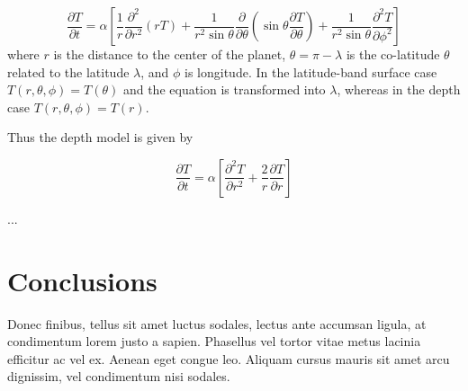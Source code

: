\documentclass[12pt, onecolumn]{revtex4-2}    %
\begin{document}
\begin{equation}
    \frac{\partial T}{\partial t}  = \alpha \left[\frac{1}{r} \frac{\partial^2 }{\partial r^2} (r T)
        + \frac{1}{r^2 \sin\theta} \frac{\partial}{\partial \theta}\left(\sin\theta \frac{\partial T}{\partial\theta}\right)
        + \frac{1}{r^2 \sin\theta} \frac{\partial^2 T}{\partial \phi^2} \right]
\end{equation}
where $r$ is the distance to the center of the planet, $\theta = \pi - \lambda$ is the co-latitude $\theta$ related to the latitude $\lambda$, and $\phi$ is longitude.
In the latitude-band surface case $T(r, \theta, \phi) = T(\theta)$ and the equation is transformed into $\lambda$, whereas in the depth case $T(r, \theta, \phi) = T(r)$.

Thus the depth model is given by

\begin{equation}
    \frac{\partial T}{\partial t} = \alpha \left[\frac{\partial^2 T}{\partial r^2} + \frac{2}{r}\frac{\partial T}{\partial r}\right]
\end{equation}

...

\section{Conclusions} \label{sec:conclusion}

Donec finibus, tellus sit amet luctus sodales, lectus ante accumsan ligula, at condimentum lorem justo a sapien. Phasellus vel tortor vitae metus lacinia efficitur ac vel ex. Aenean eget congue leo. Aliquam cursus mauris sit amet arcu dignissim, vel condimentum nisi sodales.

\end{document}
